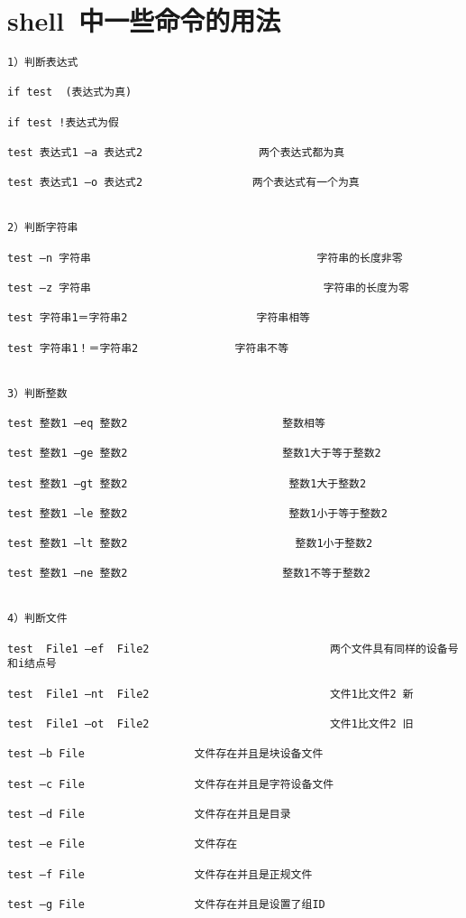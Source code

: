 \section{shell~中一些命令的用法}
\begin{verbatim}
1）判断表达式 

if test  (表达式为真)

if test !表达式为假

test 表达式1 –a 表达式2                  两个表达式都为真

test 表达式1 –o 表达式2                 两个表达式有一个为真

 
2）判断字符串

test –n 字符串                                   字符串的长度非零

test –z 字符串                                    字符串的长度为零

test 字符串1＝字符串2                    字符串相等

test 字符串1！＝字符串2               字符串不等

 
3）判断整数

test 整数1 –eq 整数2                        整数相等

test 整数1 –ge 整数2                        整数1大于等于整数2

test 整数1 –gt 整数2                         整数1大于整数2

test 整数1 –le 整数2                         整数1小于等于整数2

test 整数1 –lt 整数2                          整数1小于整数2

test 整数1 –ne 整数2                        整数1不等于整数2

 
4）判断文件

test  File1 –ef  File2                            两个文件具有同样的设备号和i结点号

test  File1 –nt  File2                            文件1比文件2 新

test  File1 –ot  File2                            文件1比文件2 旧

test –b File                 文件存在并且是块设备文件

test –c File                 文件存在并且是字符设备文件

test –d File                 文件存在并且是目录

test –e File                 文件存在

test –f File                 文件存在并且是正规文件

test –g File                 文件存在并且是设置了组ID


\end{verbatim}
